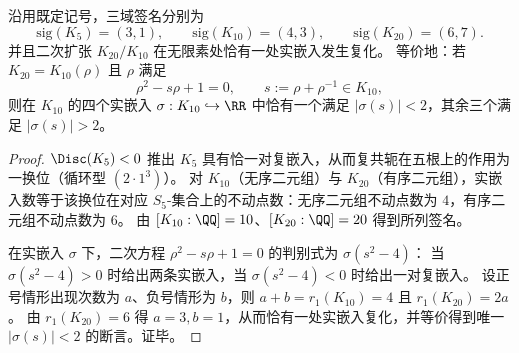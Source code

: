 \begin{theorem}[三层签名与二次塔的唯一无限分歧]\label{thm:xi-p7-s5-signatures-and-unique-archimedean-ramification}
沿用既定记号，三域签名分别为
\[
\mathrm{sig}(K_{5})=(3,1),\qquad \mathrm{sig}(K_{10})=(4,3),\qquad \mathrm{sig}(K_{20})=(6,7).
\]
并且二次扩张 \(K_{20}/K_{10}\) 在无限素处恰有一处实嵌入发生复化。
等价地：若 \(K_{20}=K_{10}(\rho)\) 且 \(\rho\) 满足
\[
\rho^{2}-s\rho+1=0,\qquad s:=\rho+\rho^{-1}\in K_{10},
\]
则在 \(K_{10}\) 的四个实嵌入 \(\sigma:K_{10}\hookrightarrow\RR\) 中恰有一个满足 \(|\sigma(s)|<2\)，其余三个满足 \(|\sigma(s)|>2\)。
\end{theorem}
\begin{proof}
\(\Disc(K_5)<0\) 推出 \(K_5\) 具有恰一对复嵌入，从而复共轭在五根上的作用为一换位（循环型 \((2\cdot 1^3)\)）。
对 \(K_{10}\)（无序二元组）与 \(K_{20}\)（有序二元组），实嵌入数等于该换位在对应 \(S_5\)-集合上的不动点数：无序二元组不动点数为 \(4\)，有序二元组不动点数为 \(6\)。
由 \([K_{10}:\QQ]=10\)、\([K_{20}:\QQ]=20\) 得到所列签名。
\par
在实嵌入 \(\sigma\) 下，二次方程 \(\rho^2-s\rho+1=0\) 的判别式为 \(\sigma(s^2-4)\)：
当 \(\sigma(s^2-4)>0\) 时给出两条实嵌入，当 \(\sigma(s^2-4)<0\) 时给出一对复嵌入。
设正号情形出现次数为 \(a\)、负号情形为 \(b\)，则 \(a+b=r_1(K_{10})=4\) 且 \(r_1(K_{20})=2a\)。
由 \(r_1(K_{20})=6\) 得 \(a=3,b=1\)，从而恰有一处实嵌入复化，并等价得到唯一 \(|\sigma(s)|<2\) 的断言。证毕。
\end{proof}



